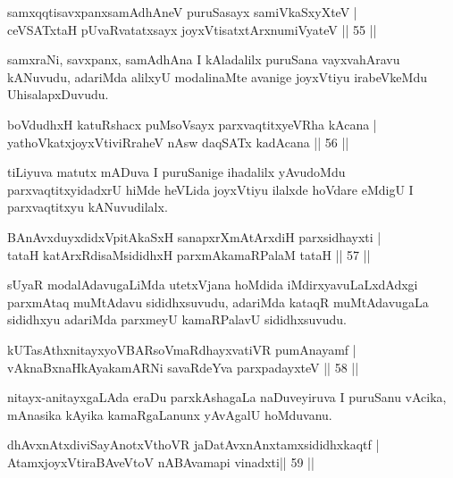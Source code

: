 \begin{shl}
samxqqtisavxpanxsamAdhAneV puruSasayx samiVkaSxyXteV | \\
ceVSATx\s taH pUvaRvatatxsayx joyxVtisatxtArxnumiVyateV \hfill||  55 ||  
\end{shl}

\begin{artha}
samxraNi, savxpanx, samAdhAna I kAladalilx puruSana vayxvahAravu kANuvudu, adariMda alilxyU modalinaMte avanige joyxVtiyu irabeVkeMdu UhisalapxDuvudu.
\end{artha}

\begin{shl}
boVdudhxH katuRshacx puMsoV\s sayx parxvaqtitxyeVRha kAcana |  \\
yathoVkatxjoyxVtiviRraheV nAsw daqSATx kadAcana \hfill||  56 ||  
\end{shl}

\begin{artha}
tiLiyuva matutx mADuva I puruSanige ihadalilx yAvudoMdu parxvaqtitxyidadxrU hiMde heVLida joyxVtiyu ilalxde hoVdare eMdigU I parxvaqtitxyu kANuvudilalx.
\end{artha}

\begin{shl}
BAnAvxduyxdidxVpitAkaSxH sanapxrXmAtArxdiH parxsidhayxti | \\
tataH katArxRdisaMsididhxH parxmAkamaRPalaM tataH \hfill||  57 ||  
\end{shl}

\begin{artha}
sUyaR modalAdavugaLiMda utetxVjana hoMdida iMdirxyavuLaLxdAdxgi parxmAtaq muMtAdavu sididhxsuvudu, adariMda kataqR muMtAdavugaLa sididhxyu adariMda parxmeyU kamaRPalavU sididhxsuvudu.
\end{artha}

\begin{shl}
kUTasAthxnitayxyoVBARsoVmaRdhayxvatiVR pumAnayamf | \\
vAknaBxnaHkAyakamARNi savaRdeYva parxpadayxteV \hfill||  58 ||  
\end{shl}

\begin{artha}
nitayx-anitayxgaLAda eraDu parxkAshagaLa naDuveyiruva I puruSanu vAcika, mAnasika kAyika kamaRgaLanunx yAvAgalU hoMduvanu.
\end{artha}

\begin{shl}
dhAvxnAtxdiviSayAnotxV\s thoVR jaDatAvxnAnx\s \s tamxsididhxkaqtf | \\
AtamxjoyxVtiraBAveV\s toV nABAvamapi vinadxti\hfill ||  59 ||  
\end{shl}

